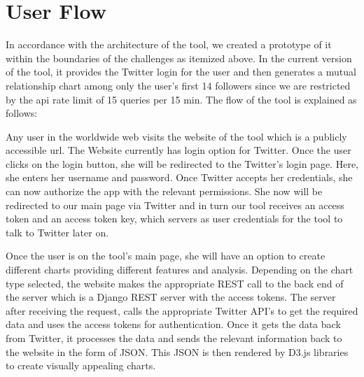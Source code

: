 \documentclass[12pt]{ucthesis}
\begin{document}
\section{User Flow}
In accordance with the architecture of the tool, we created a prototype of it within the boundaries of the challenges as itemized above. In the current version of the tool, it provides the Twitter login for the user and then generates a mutual relationship chart among only the user's  first 14 followers since we are restricted by the api rate limit of 15 queries per 15 min. The flow of the tool is explained as follows:

Any user in the worldwide web visits the website \cite{persma} of the tool which is a publicly accessible url. The Website currently has login option for Twitter. Once the user clicks on the login button, she will be redirected to the Twitter's login page. Here, she enters her username and password. Once Twitter accepts her credentials, she can now authorize the app with the relevant permissions. She now will be redirected to our main page via Twitter and in turn our tool receives an access token and an access token key, which servers as user credentials for the tool to talk to Twitter later on.

Once the user is on the tool's main page, she will have an option to create different charts providing different features and analysis. Depending on the chart type selected, the website makes the appropriate REST call to the back end of the server which is a Django REST server with the access tokens. The server after receiving the request, calls the appropriate Twitter API's to get the required data and uses the access tokens for authentication. Once it gets the data back from Twitter, it processes the data and sends the relevant information back to the website in the form of JSON. This JSON is then rendered by D3.js libraries to create visually appealing charts.
\end{document}
